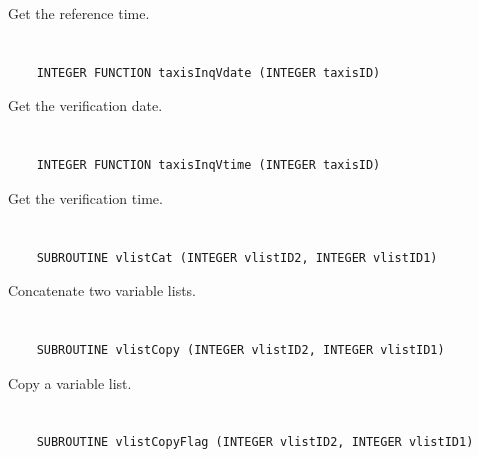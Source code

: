 Get the reference time.


\section*{\tt {}}

\begin{verbatim}
    INTEGER FUNCTION taxisInqVdate (INTEGER taxisID)
\end{verbatim}

Get the verification date.


\section*{\tt {}}

\begin{verbatim}
    INTEGER FUNCTION taxisInqVtime (INTEGER taxisID)
\end{verbatim}

Get the verification time.


\section*{\tt {}}

\begin{verbatim}
    SUBROUTINE vlistCat (INTEGER vlistID2, INTEGER vlistID1)
\end{verbatim}

Concatenate two variable lists.


\section*{\tt {}}

\begin{verbatim}
    SUBROUTINE vlistCopy (INTEGER vlistID2, INTEGER vlistID1)
\end{verbatim}

Copy a variable list.


\section*{\tt {}}

\begin{verbatim}
    SUBROUTINE vlistCopyFlag (INTEGER vlistID2, INTEGER vlistID1)
\end{verbatim}

